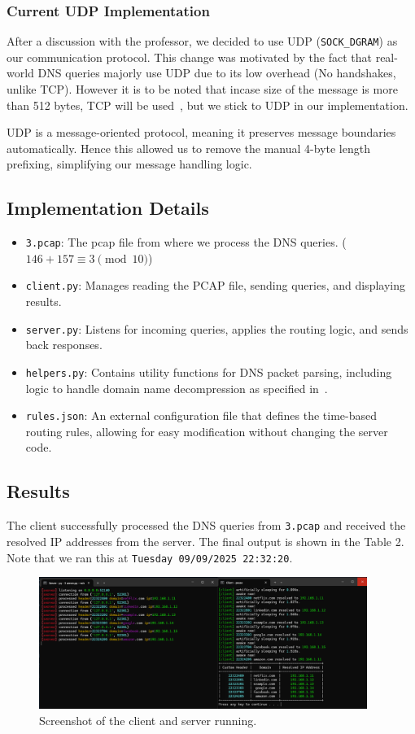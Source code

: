 \documentclass{article}
\begin{document}
\subsubsection{Current UDP Implementation}
After a discussion with the professor, we decided to use UDP (\texttt{SOCK\_DGRAM}) as our communication protocol. This change was motivated by the fact that real-world DNS queries majorly use UDP due to its low overhead (No handshakes, unlike TCP). However it is to be noted that incase size of the message is more than 512 bytes, TCP will be used~\cite{rfc1035}, but we stick to UDP in our implementation.  

UDP is a message-oriented protocol, meaning it preserves message boundaries automatically. Hence this allowed us to remove the manual 4-byte length prefixing, simplifying our message handling logic. 

\subsection{Implementation Details}
\begin{itemize}
    \item \texttt{3.pcap}: The pcap file from where we process the DNS queries. ($ 146 + 157 \equiv 3 \pmod{10} $)
    \item \texttt{client.py}: Manages reading the PCAP file, sending queries, and displaying results.
    \item \texttt{server.py}: Listens for incoming queries, applies the routing logic, and sends back responses.
    \item \texttt{helpers.py}: Contains utility functions for DNS packet parsing, including logic to handle domain name decompression as specified in~\cite{rfc1035}.
    \item \texttt{rules.json}: An external configuration file that defines the time-based routing rules, allowing for easy modification without changing the server code.
\end{itemize}

\subsection{Results}
The client successfully processed the DNS queries from \texttt{3.pcap} and received the resolved IP addresses from the server. The final output is shown in the Table 2. \\
Note that we ran this at \texttt{Tuesday 09/09/2025 22:32:20}.
\begin{figure}[H]
    \centering
    \includegraphics[width=0.95\textwidth]{task1.png}
    \caption{Screenshot of the client and server running.}
\end{figure}
\end{document}
